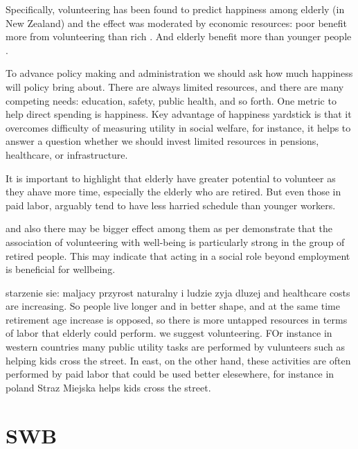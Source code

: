 \documentclass[10pt, letterpaper]{article}
\begin{document}
\begin{spacing}{1.4}
Specifically, volunteering has been found to predict happiness among elderly (in
New Zealand) and the effect was moderated by
economic resources: poor benefit more from volunteering than rich
\citep{dulin2012volunteering}. And elderly benefit more than  younger people \citep{van2000differential}. 

To advance policy making and
administration we should ask how much happiness will policy bring
about. There are always limited resources, and there are many competing needs: education, safety, public
health, and so forth. One metric to help direct spending is happiness.
Key  advantage of happiness yardstick is that it overcomes difficulty
of measuring utility in social welfare, for instance, it helps to answer
a question whether we should  invest
limited resources in pensions, healthcare, or infrastructure.



It is important to highlight that elderly have greater potential to volunteer as
they ahave more time, especially the elderly who are retired. But even those in
paid labor, arguably tend to have less harried schedule than younger workers.

and also there may be bigger effect among them as per \citep{wahrendorf06}
demonstrate that the association of
volunteering with well-being is particularly strong in the
group of retired people. This may indicate that acting in
a social role beyond employment is beneficial for wellbeing.


starzenie sie: maljacy przyrost naturalny i ludzie zyja dluzej and healthcare
costs are increasing. So people live longer and in better shape, and at the same
time retirement age increase is opposed, so there is more untapped resources in
terms of labor that elderly could perform. we suggest volunteering. FOr instance
in western countries many public utility tasks are performed by vulunteers such
as helping kids cross the street. In east, on the other hand, these activities
are often performed by paid labor that could be used better elesewhere, for
instance in poland Straz Miejska helps kids cross the street. %


\section{SWB} 


\end{spacing}
\end{document}
